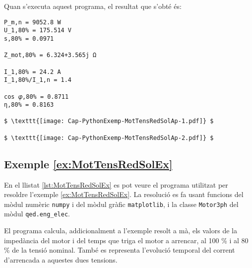 Quan s'executa aquest programa, el resultat que s'obté és:
\lstset{
	language=,
	numbers=none,
	frame=none
}
\begin{lstlisting}[mathescape=true]
P_m,n = 9052.8 W
U_1,80% = 175.514 V
s,80% = 0.0971

Z_mot,80% = 6.324+3.565j Ω

I_1,80% = 24.2 A
I_1,80%/I_1,n = 1.4

cos 𝜑,80% = 0.8711
η,80% = 0.8163
	
$ \texttt{[image: Cap-PythonExemp-MotTensRedSolAp-1.pdf]} $

$ \texttt{[image: Cap-PythonExemp-MotTensRedSolAp-2.pdf]} $
\end{lstlisting} 



\hypertarget{exemple:MotTensRedSolEx}{\subsection{Exemple \ref*{ex:MotTensRedSolEx} \MotTensRedSolEx}}
En el llistat \vref{lst:MotTensRedSolEx} es pot veure el programa utilitzat per resoldre l'exemple \vref{ex:MotTensRedSolEx}. La resolució es fa usant funcions del mòdul numèric \texttt{numpy} i del mòdul gràfic \texttt{matplotlib},  i la classe \texttt{Motor3ph} del mòdul \texttt{qed.eng\_elec}.


El programa calcula, addicionalment a l'exemple resolt a mà, els valors de la impedància del motor i  del temps que triga el motor a arrencar, al 100 \% i al 80 \% de la tensió nominal. També es representa l'evolució temporal del  corrent d'arrencada a aquestes dues tensions.

